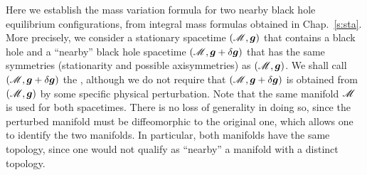 Here we establish the mass variation formula for two nearby black hole
equilibrium configurations, from integral mass formulas obtained in Chap.~\ref{s:sta}.
More precisely, we consider a stationary spacetime $(\mathscr{M},\bm{g})$ that contains
a black hole and a ``nearby'' black hole spacetime $(\mathscr{M},\bm{g}+\delta\bm{g})$ that has the
same symmetries (stationarity and possible axisymmetries) as $(\mathscr{M},\bm{g})$.
We shall call $(\mathscr{M},\bm{g}+\delta\bm{g})$ the ,
although we do not require that $(\mathscr{M},\bm{g}+\delta\bm{g})$ is obtained from
$(\mathscr{M},\bm{g})$ by some specific physical perturbation.
Note that the same manifold $\mathscr{M}$ is used for both spacetimes.
There is no loss of generality in doing so, since the perturbed manifold
must be diffeomorphic to the original one, which allows one to
identify the two manifolds. In particular, both manifolds have the same
topology, since one would not qualify as ``nearby'' a manifold with a distinct topology.


